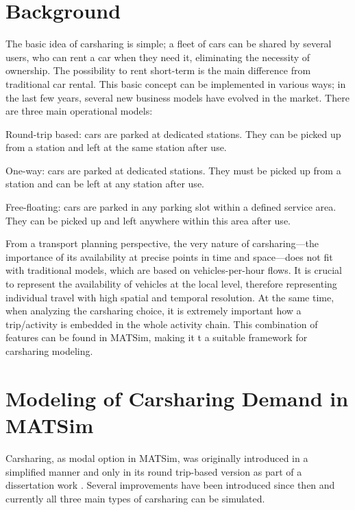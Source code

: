 \section{Background}
The basic idea of carsharing is simple; a fleet of cars can be shared by several users, who can rent a car when they need it, eliminating the necessity of ownership. The possibility to rent short-term is the main difference from traditional car rental. This basic concept can be implemented in various ways; in the last few years, several new business models have evolved in the market. There are three main operational models:
%
\begin{compactitem}
	\item Round-trip based: cars are parked at dedicated stations. They can be picked up from a station and left at the same station after use.
	\item One-way: cars are parked at dedicated stations. They must be picked up from a station and can be left at any station after use.
	\item Free-floating: cars are parked in any parking slot within a defined service area. They can be picked up and left anywhere within this area after use. 
\end{compactitem}
%
From a transport planning perspective, the very nature of carsharing---the importance of its availability at precise points in time and space---does not fit with traditional models, which are based on vehicles-per-hour flows. It is crucial to represent the availability of vehicles at the local level,  therefore representing individual travel with high spatial and temporal resolution. At the same time, when analyzing the carsharing choice, it is extremely important how a trip/activity is embedded in the whole activity chain. This combination of features can be found in MATSim, making it t a suitable framework for carsharing modeling. 

\section{Modeling of Carsharing Demand in MATSim}
Carsharing, as modal option in MATSim, was originally introduced in a simplified manner and only in its round trip-based version as part of a dissertation work \citep[][]{Ciari_PhDThesis_2012}. Several improvements have been introduced since then and currently all three main types of carsharing can be simulated.

